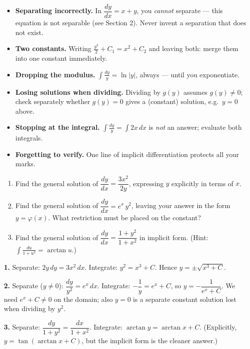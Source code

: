 \documentclass[11pt]{article}
\begin{document}
\begin{attention}
\begin{itemize}
\item \textbf{Separating incorrectly.} In $\dfrac{dy}{dx} = x + y$, you \emph{cannot} separate — this equation is not separable (see Section 2). Never invent a separation that does not exist.
\item \textbf{Two constants.} Writing $\frac{y^2}{2} + C_1 = x^2 + C_2$ and leaving both: merge them into one constant immediately.
\item \textbf{Dropping the modulus.} $\int \frac{dy}{y} = \ln|y|$, always — until you exponentiate.
\item \textbf{Losing solutions when dividing.} Dividing by $g(y)$ assumes $g(y) \neq 0$; check separately whether $g(y) = 0$ gives a (constant) solution, e.g.\ $y = 0$ above.
\item \textbf{Stopping at the integral.} $\int \frac{dy}{y} = \int 2x\,dx$ is \emph{not} an answer; evaluate both integrals.
\item \textbf{Forgetting to verify.} One line of implicit differentiation protects all your marks.
\end{itemize}
\end{attention}

\begin{exercice}[Practice]
\begin{enumerate}
\item Find the general solution of $\dfrac{dy}{dx} = \dfrac{3x^2}{2y}$, expressing $y$ explicitly in terms of $x$.
\item Find the general solution of $\dfrac{dy}{dx} = e^{x}\,y^2$, leaving your answer in the form $y = \varphi(x)$. What restriction must be placed on the constant?
\item Find the general solution of $\dfrac{dy}{dx} = \dfrac{1 + y^2}{1 + x^2}$ in implicit form. (Hint: $\displaystyle\int\frac{du}{1+u^2} = \arctan u$.)
\end{enumerate}
\end{exercice}

\begin{corrige}[Exercise 1]
\textbf{1.} Separate: $2y\,dy = 3x^2\,dx$. Integrate: $y^2 = x^3 + C$. Hence $y = \pm\sqrt{x^3 + C}$.

\textbf{2.} Separate ($y \neq 0$): $\dfrac{dy}{y^2} = e^{x}\,dx$. Integrate: $-\dfrac{1}{y} = e^{x} + C$, so $y = -\dfrac{1}{e^{x} + C}$. We need $e^x + C \neq 0$ on the domain; also $y = 0$ is a separate constant solution lost when dividing by $y^2$.

\textbf{3.} Separate: $\dfrac{dy}{1+y^2} = \dfrac{dx}{1+x^2}$. Integrate: $\arctan y = \arctan x + C$. (Explicitly, $y = \tan(\arctan x + C)$, but the implicit form is the cleaner answer.)
\end{corrige}
\end{document}
